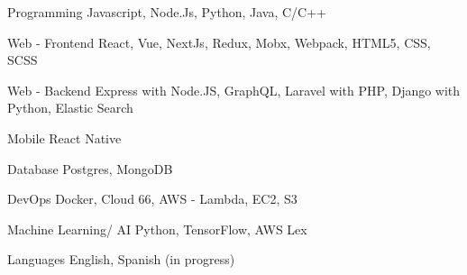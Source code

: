 


\begin{cvskills}


\cvskill
{Programming} %
{Javascript, Node.Js, Python, Java, C/C++} %


\cvskill
{Web - Frontend} %
{React, Vue, NextJs, Redux, Mobx, Webpack, HTML5, CSS, SCSS} %


\cvskill
{Web - Backend} %
{Express with Node.JS, GraphQL, Laravel with PHP, Django with Python, Elastic Search} %


\cvskill
{Mobile} %
{React Native} %


\cvskill
{Database} %
{Postgres, MongoDB} %


\cvskill
{DevOps} %
{Docker, Cloud 66, AWS - Lambda, EC2, S3} %


\cvskill
{Machine Learning/ AI} %
{Python, TensorFlow, AWS Lex} %


\cvskill
{Languages} %
{English, Spanish (in progress)} %


\end{cvskills}